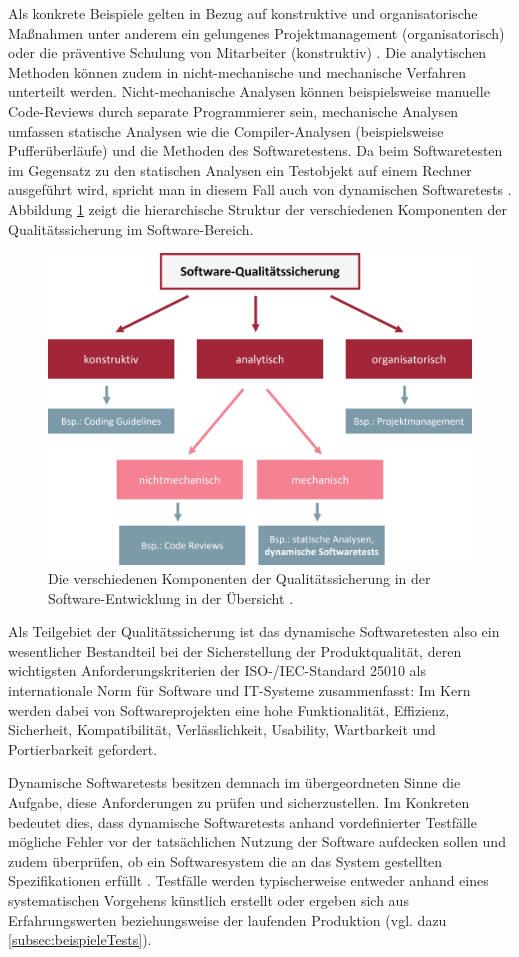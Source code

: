 Als konkrete Beispiele gelten in Bezug auf konstruktive und organisatorische Maßnahmen unter anderem ein gelungenes Projektmanagement (organisatorisch) oder die präventive Schulung von Mitarbeiter (konstruktiv) \cite[S. 272]{ludewig2010software}. Die analytischen Methoden können zudem in nicht-mechanische und mechanische Verfahren unterteilt werden. Nicht-mechanische Analysen können beispielsweise manuelle Code-Reviews durch separate Programmierer sein, mechanische Analysen umfassen statische Analysen wie die Compiler-Analysen (beispielsweise Pufferüberläufe) und die Methoden des Softwaretestens. Da beim Softwaretesten im Gegensatz zu den statischen Analysen ein Testobjekt auf einem Rechner ausgeführt wird, spricht man in diesem Fall auch von dynamischen Softwaretests \cite[S. 135]{spillner2010basiswissen}. Abbildung \ref{fig:qualitaetssicherung} zeigt die hierarchische Struktur der verschiedenen Komponenten der Qualitätssicherung im Software-Bereich.

\begin{figure}[!h]
\centering
\includegraphics[width=0.5\columnwidth]{images/Qualitaetssicherung_Uebersicht.jpg}
\caption{Die verschiedenen Komponenten der Qualitätssicherung in der Software-Entwicklung in der Übersicht \cite[S. 271]{ludewig2010software}.}
\label{fig:qualitaetssicherung}
\end{figure}


Als Teilgebiet der Qualitätssicherung ist das dynamische Softwaretesten also ein wesentlicher Bestandteil bei der Sicherstellung der Produktqualität, deren wichtigsten Anforderungskriterien der ISO-/IEC-Standard 25010 \cite{ISO25010} als internationale Norm für Software und IT-Systeme zusammenfasst: Im Kern werden dabei von Softwareprojekten eine hohe Funktionalität, Effizienz, Sicherheit, Kompatibilität, Verlässlichkeit, Usability, Wartbarkeit und Portierbarkeit gefordert.

Dynamische Softwaretests besitzen demnach im übergeordneten Sinne die Aufgabe, diese Anforderungen zu prüfen und sicherzustellen. Im Konkreten bedeutet dies, dass dynamische Softwaretests anhand vordefinierter Testfälle mögliche Fehler vor der tatsächlichen Nutzung der Software aufdecken sollen und zudem überprüfen, ob ein Softwaresystem die an das System gestellten Spezifikationen erfüllt \cite[S. 246]{sommerville2012software-engineering}. Testfälle werden typischerweise entweder anhand eines systematischen Vorgehens künstlich erstellt oder ergeben sich aus Erfahrungswerten beziehungsweise der laufenden Produktion (vgl. dazu \autoref{subsec:beispieleTests}).  

